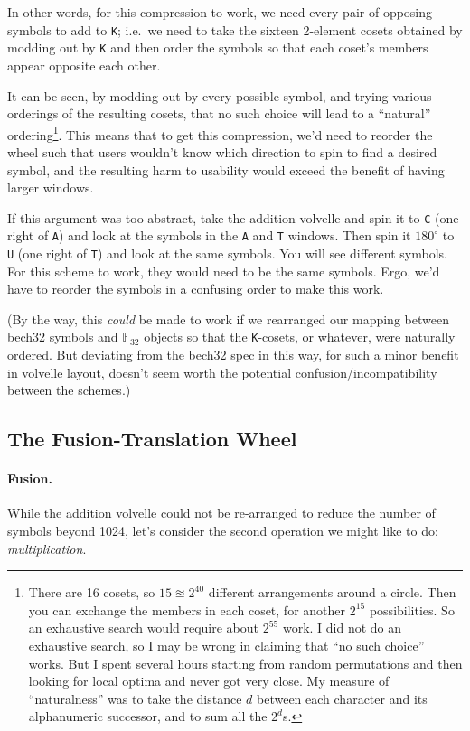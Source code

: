 \documentclass[letterpaper]{article}
\newcommand{\fttwo}{\mathbb{F}_{32}}
\newcommand{\vc}[1]{\texttt{#1}} %
\begin{document}
In other words, for this compression to work, we need every pair of opposing
symbols to add to \vc{K}; i.e.~we need to take the sixteen 2-element cosets
obtained by modding out by \vc{K} and then order the symbols so that each
coset's members appear opposite each other.

It can be seen, by modding out by every possible symbol, and trying various
orderings of the resulting cosets, that no such choice will lead to a
``natural'' ordering\footnote{There are 16 cosets, so $15\approxeq2^{40}$
different arrangements around a circle. Then you can exchange the members
in each coset, for another $2^{15}$ possibilities. So an exhaustive search
would require about $2^{55}$ work. I did not do an exhaustive search, so I
may be wrong in claiming that ``no such choice'' works. But I spent several
hours starting from random permutations and then looking for local optima
and never got very close. My measure of ``naturalness'' was to take the
distance $d$ between each character and its alphanumeric successor, and to
sum all the $2^d$s.}. This means that to get this compression, we'd need
to reorder the wheel such that users wouldn't know which direction to spin
to find a desired symbol, and the resulting harm to usability would exceed
the benefit of having larger windows.

If this argument was too abstract, take the addition volvelle and spin it to
\vc{C} (one right of \vc{A}) and look at the symbols in the \vc{A} and \vc{T}
windows. Then spin it $180^\circ$ to \vc{U} (one right of \vc{T}) and look
at the same symbols. You will see different symbols. For this scheme to work,
they would need to be the same symbols. Ergo, we'd have to reorder the symbols
in a confusing order to make this work.

(By the way, this \emph{could} be made to work if we rearranged our mapping
between bech32 symbols and $\fttwo$ objects so that the \vc{K}-cosets, or
whatever, were naturally ordered. But deviating from the bech32 spec in this
way, for such a minor benefit in volvelle layout, doesn't seem worth the
potential confusion/incompatibility between the schemes.)

\subsection{The Fusion-Translation Wheel}

\paragraph{Fusion.}
While the addition volvelle could not be re-arranged to reduce the number of
symbols beyond 1024, let's consider the second operation we might like to do:
\emph{multiplication}.
\end{document}
